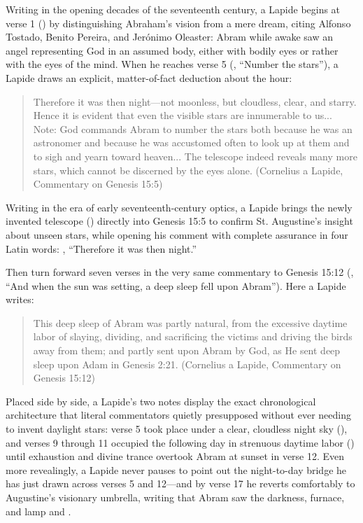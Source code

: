 Writing in the opening decades of the seventeenth century, a Lapide begins at verse 1 () by distinguishing Abraham's vision from a mere dream, citing Alfonso Tostado, Benito Pereira, and Jer\'{o}nimo Oleaster: Abram while awake saw an angel representing God in an assumed body, either with bodily eyes or rather with the eyes of the mind. When he reaches verse 5 (, ``Number the stars''), a Lapide draws an explicit, matter-of-fact deduction about the hour:

\begin{quote}
Therefore it was then night---not moonless, but cloudless, clear, and starry. Hence it is evident that even the visible stars are innumerable to us... Note: God commands Abram to number the stars both because he was an astronomer and because he was accustomed often to look up at them and to sigh and yearn toward heaven... The telescope indeed reveals many more stars, which cannot be discerned by the eyes alone. (Cornelius a Lapide, Commentary on Genesis 15:5)
\end{quote}

Writing in the era of early seventeenth-century optics, a Lapide brings the newly invented telescope () directly into Genesis 15:5 to confirm St. Augustine's insight about unseen stars, while opening his comment with complete assurance in four Latin words: , ``Therefore it was then night.''

Then turn forward seven verses in the very same commentary to Genesis 15:12 (, ``And when the sun was setting, a deep sleep fell upon Abram''). Here a Lapide writes:

\begin{quote}
This deep sleep of Abram was partly natural, from the excessive daytime labor of slaying, dividing, and sacrificing the victims and driving the birds away from them; and partly sent upon Abram by God, as He sent deep sleep upon Adam in Genesis 2:21. (Cornelius a Lapide, Commentary on Genesis 15:12)
\end{quote}

Placed side by side, a Lapide's two notes display the exact chronological architecture that literal commentators quietly presupposed without ever needing to invent daylight stars: verse 5 took place under a clear, cloudless night sky (), and verses 9 through 11 occupied the following day in strenuous daytime labor () until exhaustion and divine trance overtook Abram at sunset in verse 12. Even more revealingly, a Lapide never pauses to point out the night-to-day bridge he has just drawn across verses 5 and 12---and by verse 17 he reverts comfortably to Augustine's visionary umbrella, writing that Abram saw the darkness, furnace, and lamp  and .


